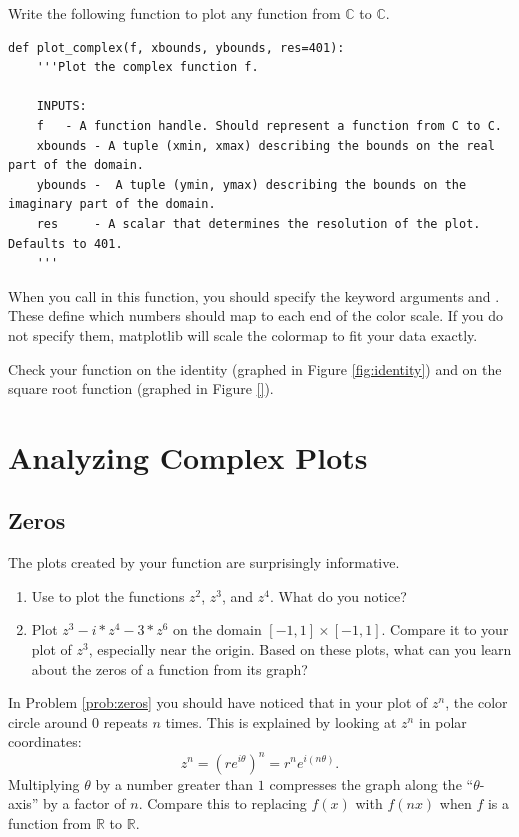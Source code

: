 \begin{problem}
Write the following function to plot any function from $\mathbb{C}$ to $\mathbb{C}$.
\begin{lstlisting}
def plot_complex(f, xbounds, ybounds, res=401):
    '''Plot the complex function f.
    
    INPUTS:
    f	- A function handle. Should represent a function from C to C.
    xbounds	- A tuple (xmin, xmax) describing the bounds on the real part of the domain.
    ybounds	-  A tuple (ymin, ymax) describing the bounds on the imaginary part of the domain.
    res		- A scalar that determines the resolution of the plot. Defaults to 401.
    '''
\end{lstlisting}
When you call  in this function, you should specify the keyword arguments  and . 
These define which numbers should map to each end of the color scale. 
If you do not specify them, matplotlib will scale the colormap to fit your data exactly.

Check your function on the identity (graphed in Figure \ref{fig:identity}) and on the square root function (graphed in Figure \ref{}).
\end{problem}


\section*{Analyzing Complex Plots}

\subsection*{Zeros}

The plots created by your function  are surprisingly informative.

\begin{problem}\label{prob:zeros}
\leavevmode
\begin{enumerate}
\item Use  to plot the functions $z^2$, $z^3$, and $z^4$. What do you notice?
\item Plot $z^3 - i*z^4 - 3*z^6$ on the domain $[-1,1] \times [-1,1]$. 
Compare it to your plot of $z^3$, especially near the origin.
Based on these plots, what can you learn about the zeros of a function from its graph?
\end{enumerate}
\end{problem}

In Problem \ref{prob:zeros} you should have noticed that in your plot of $z^n$, the color circle around 0 repeats $n$ times. 
This is explained by looking at $z^n$ in polar coordinates:
\[
z^n = (re^{i \theta})^n = r^n e^{i(n\theta)}.
\]
Multiplying $\theta$ by a number greater than $1$ compresses the graph along the ``$\theta$-axis'' by a factor of $n$. 
Compare this to replacing $f(x)$ with $f(nx)$ when $f$ is a function from $\mathbb{R}$ to $\mathbb{R}$.

